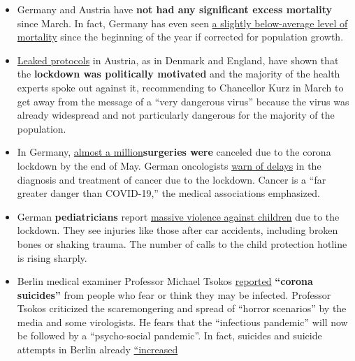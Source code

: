 \begin{itemize}
\tightlist
\item
  Germany and Austria have \textbf{not had any significant excess
  mortality} since March. In fact, Germany has even seen
  \href{https://swprs.files.wordpress.com/2020/06/breyer-deutschland-untersterblichkeit.pdf}{a
  slightly below-average level of mortality} since the beginning of the
  year if corrected for population growth.
\item
  \href{https://www.falter.at/zeitung/20200512/was-passiert-wenn-es-eng-wird}{Leaked
  protocols} in Austria, as in Denmark and England, have shown that the
  \textbf{lockdown was politically motivated} and the majority of the
  health experts spoke out against it, recommending to Chancellor Kurz
  in March to get away from the message of a ``very dangerous virus''
  because the virus was already widespread and not particularly
  dangerous for the majority of the population.
\item
  In Germany,
  \href{https://www.welt.de/wirtschaft/article208557665/Wegen-Corona-In-Deutschland-wurden-908-000-OPs-aufgeschoben.html}{almost
  a million}\textbf{surgeries were} canceled due to the corona lockdown
  by the end of May. German oncologists
  \href{https://deutsch.medscape.com/artikelansicht/4908889}{warn of
  delays} in the diagnosis and treatment of cancer due to the lockdown.
  Cancer is a ``far greater danger than COVID-19,'' the medical
  associations emphasized.
\item
  German \textbf{pediatricians} report
  \href{https://www.tagesspiegel.de/politik/knochenbrueche-oder-schuetteltraumata-mediziner-berichten-von-massiver-gewalt-gegen-kinder/25833740.html}{massive
  violence against children} due to the lockdown. They see injuries like
  those after car accidents, including broken bones or shaking trauma.
  The number of calls to the child protection hotline is rising sharply.
\item
  Berlin medical examiner Professor Michael Tsokos
  \href{https://www.bz-berlin.de/berlin/michael-tsokos-berlins-bekanntester-gerichtsmediziner-spricht-von-corona-suiziden-durch-panikmache}{reported}
  \textbf{``corona suicides''} from people who fear or think they may be
  infected. Professor Tsokos criticized the scaremongering and spread of
  ``horror scenarios'' by the media and some virologists. He fears that
  the ``infectious pandemic'' will now be followed by a ``psycho-social
  pandemic''. In fact, suicides and suicide attempts in Berlin already
  \href{https://www.tichyseinblick.de/daili-es-sentials/suizide-in-berlin-steigen-im-ersten-quartal-drastisch/}{``increased
}
\end{itemize}

